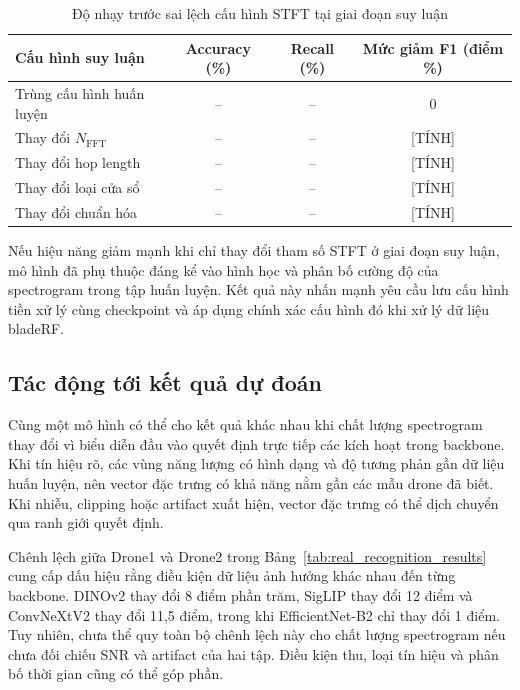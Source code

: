 \documentclass[../DoAn.tex]{subfiles}
\begin{document}
\begin{table}[H]
    \centering
    \caption{Độ nhạy trước sai lệch cấu hình STFT tại giai đoạn suy luận}
    \label{tab:stft_mismatch_results}
    \renewcommand{\arraystretch}{1.3}
    \begin{tabular}{|p{}|c|c|c|}
        \hline
        \textbf{Cấu hình suy luận} & \textbf{Accuracy (\%)} & \textbf{Recall (\%)} & \textbf{Mức giảm F1 (điểm \%)} \\ \hline
        Trùng cấu hình huấn luyện & -- & -- & 0 \\ \hline
        Thay đổi $N_{\mathrm{FFT}}$ & -- & -- & [TÍNH] \\ \hline
        Thay đổi hop length & -- & -- & [TÍNH] \\ \hline
        Thay đổi loại cửa sổ & -- & -- & [TÍNH] \\ \hline
        Thay đổi chuẩn hóa & -- & -- & [TÍNH] \\ \hline
    \end{tabular}
\end{table}

Nếu hiệu năng giảm mạnh khi chỉ thay đổi tham số STFT ở giai đoạn suy luận, mô hình đã phụ thuộc đáng kể vào hình học và phân bố cường độ của spectrogram trong tập huấn luyện. Kết quả này nhấn mạnh yêu cầu lưu cấu hình tiền xử lý cùng checkpoint và áp dụng chính xác cấu hình đó khi xử lý dữ liệu bladeRF.

\subsection{Tác động tới kết quả dự đoán}

Cùng một mô hình có thể cho kết quả khác nhau khi chất lượng spectrogram thay đổi vì biểu diễn đầu vào quyết định trực tiếp các kích hoạt trong backbone. Khi tín hiệu rõ, các vùng năng lượng có hình dạng và độ tương phản gần dữ liệu huấn luyện, nên vector đặc trưng có khả năng nằm gần các mẫu drone đã biết. Khi nhiễu, clipping hoặc artifact xuất hiện, vector đặc trưng có thể dịch chuyển qua ranh giới quyết định.

Chênh lệch giữa Drone1 và Drone2 trong Bảng~\ref{tab:real_recognition_results} cung cấp dấu hiệu rằng điều kiện dữ liệu ảnh hưởng khác nhau đến từng backbone. DINOv2 thay đổi 8 điểm phần trăm, SigLIP thay đổi 12 điểm và ConvNeXtV2 thay đổi 11,5 điểm, trong khi EfficientNet-B2 chỉ thay đổi 1 điểm. Tuy nhiên, chưa thể quy toàn bộ chênh lệch này cho chất lượng spectrogram nếu chưa đối chiếu SNR và artifact của hai tập. Điều kiện thu, loại tín hiệu và phân bố thời gian cũng có thể góp phần.
\end{document}
